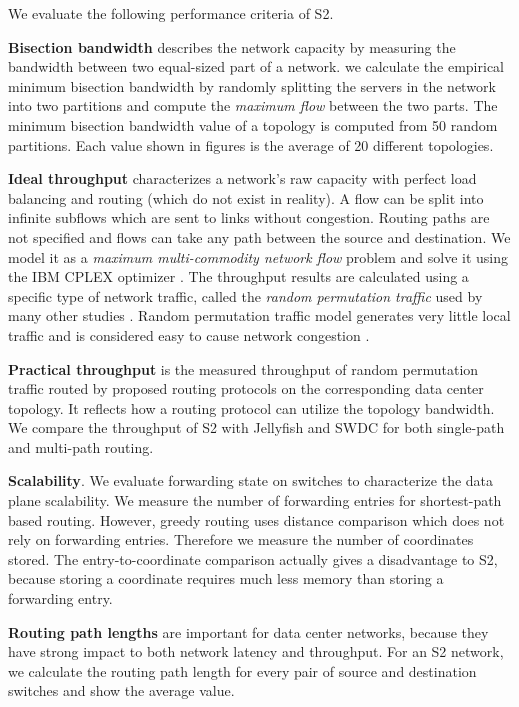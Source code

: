 \documentclass[10pt,conference]{IEEEtran}
\begin{document}
We evaluate the following performance criteria of S2.

\textbf{Bisection bandwidth} describes the network capacity by measuring the bandwidth between two equal-sized part of a network.
we calculate the empirical minimum bisection bandwidth by randomly splitting the servers in the network into two partitions and compute the \emph{maximum flow} between the two parts.
The minimum bisection bandwidth value of a topology is computed from 50 random partitions. Each value shown in figures is the average of 20 different topologies.

\textbf{Ideal throughput} characterizes a network's raw capacity with perfect load balancing and routing (which do not exist in reality). A flow can be split into infinite subflows which are sent to links without congestion. Routing paths are not specified and flows can take any path between the source and destination. We model it as a  \emph{maximum multi-commodity network flow} problem and solve it using the IBM CPLEX optimizer \cite{CPLEX}. The throughput results are calculated using  a specific type of network traffic, called the \textit{random permutation traffic} used by many other studies \cite{Hedera} \cite{Jellyfish} \cite{Godfrey14}. Random permutation traffic model generates very little local traffic and is considered easy to cause network congestion \cite{Hedera}.

\textbf{Practical throughput} is the measured throughput of random permutation traffic routed by proposed routing protocols on the corresponding data center topology. It reflects how a routing protocol can utilize the topology bandwidth. We compare the throughput of S2 with Jellyfish and SWDC for both single-path and multi-path routing.


\textbf{Scalability}. We evaluate forwarding state on switches to characterize the data plane scalability. We measure the number of forwarding entries for shortest-path based routing. However, greedy routing uses distance comparison which does not rely on forwarding entries. Therefore we measure the number of coordinates stored. The entry-to-coordinate comparison actually gives a disadvantage to S2, because storing a coordinate requires much less memory than storing a forwarding entry.

\textbf{Routing path lengths} are important for data center networks, because they have strong impact to both network latency and throughput. For an S2 network, we calculate the routing path length for every pair of source and destination switches and show the average value. 
\end{document}
